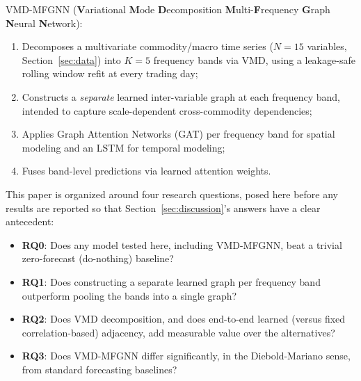 \documentclass[journal]{IEEEtran}
\begin{document}
VMD-MFGNN (\textbf{V}ariational \textbf{M}ode \textbf{D}ecomposition \textbf{M}ulti-\textbf{F}requency \textbf{G}raph \textbf{N}eural \textbf{N}etwork):

\begin{enumerate}
    \item Decomposes a multivariate commodity/macro time series ($N=15$ variables, Section~\ref{sec:data}) into $K=5$ frequency bands via VMD, using a leakage-safe rolling window refit at every trading day;
    \item Constructs a \emph{separate} learned inter-variable graph at each frequency band, intended to capture scale-dependent cross-commodity dependencies;
    \item Applies Graph Attention Networks (GAT) per frequency band for spatial modeling and an LSTM for temporal modeling;
    \item Fuses band-level predictions via learned attention weights.
\end{enumerate}

This paper is organized around four research questions, posed here before any results are reported so that Section~\ref{sec:discussion}'s answers have a clear antecedent:
\begin{itemize}
    \item \textbf{RQ0}: Does any model tested here, including VMD-MFGNN, beat a trivial zero-forecast (do-nothing) baseline?
    \item \textbf{RQ1}: Does constructing a separate learned graph per frequency band outperform pooling the bands into a single graph?
    \item \textbf{RQ2}: Does VMD decomposition, and does end-to-end learned (versus fixed correlation-based) adjacency, add measurable value over the alternatives?
    \item \textbf{RQ3}: Does VMD-MFGNN differ significantly, in the Diebold-Mariano sense, from standard forecasting baselines?
\end{itemize}
\end{document}
